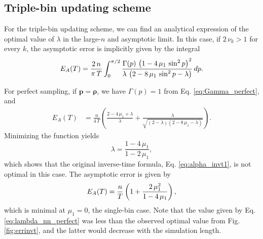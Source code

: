 \documentclass[reprint, superscriptaddress, floatfix]{revtex4-1}
\newcommand{\Err}{E}
\begin{document}
\subsection{\label{sec:invt_nn}
Triple-bin updating scheme}




For the triple-bin updating scheme,
we can find an analytical expression
of the optimal value of $\lambda$
in the large-$n$ and asymptotic limit.
%
In this case,
if $2 \, \nu_k > 1$ for every $k$,
the asymptotic error is implicitly given by the integral
%
\begin{align}
  \Err_A(T)
  =
  \frac{ 2 \, n  }
       { \pi \, T }
  \int_0^{\pi/2}
    \frac{ \Gamma(p) \, \left(1 - 4 \, \mu_1 \, \sin^2 p \right)^2    }
         {   \lambda \, \left(2 - 8 \, \mu_1 \, \sin^2 p - \lambda \right) }
  \, dp
  .
\notag
\end{align}



For perfect sampling, if $\mathbf p = \pmb \rho$,
we have
$\Gamma(p) = 1$ from Eq. \eqref{eq:Gamma_perfect},
and
$$
\begin{aligned}
  \Err_A(T)
  &=
  \frac{n}{4 \, T}
  \left(
    \frac{2 - 4 \, \mu_1 + \lambda}{ \lambda }
    +
    \frac{ \lambda }
    { \sqrt{ (2 - \lambda) (2 - 8 \, \mu_1 - \lambda) } }
  \right)
.
\end{aligned}
$$
%
Minimizing the function yields
%
\begin{equation}
  \lambda
  =
  \frac{ 1 - 4 \, \mu_1 }
       { 1 - 2 \, \mu_1 }
  ,
\label{eq:lambda_nn_perfect}
\end{equation}
%
which shows that the original inverse-time formula,
Eq. \eqref{eq:alpha_invt1},
is not optimal in this case.
%
The asymptotic error is given by
%
\begin{equation}
  \Err_A(T)
  =
  \frac{n}{T}
  \left(
    1+ \frac{2 \, \mu_1^2}{1-4 \, \mu_1}
  \right)
  ,
\notag
\end{equation}
%
which
is minimal at $\mu_1 = 0$, the single-bin case.
%
Note that the value given by
Eq. \eqref{eq:lambda_nn_perfect}
was less than the observed optimal value
from Fig. \ref{fig:errinvt},
and the latter would decrease
with the simulation length.
%
\end{document}
